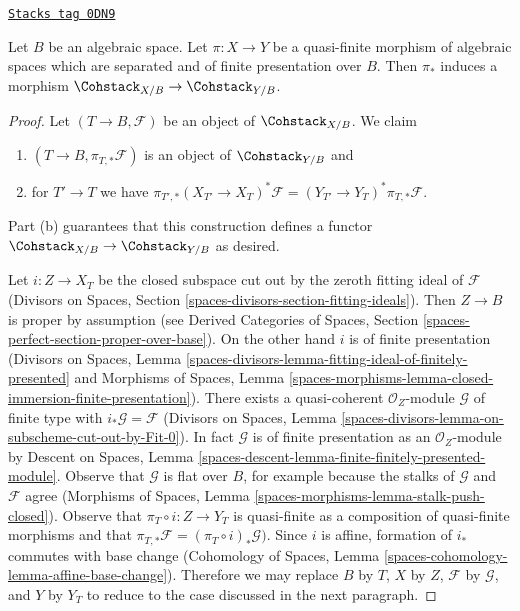 \begin{lemma}
\label{moduli-lemma-coherent-functorial}
\href{https://stacks.math.columbia.edu/tag/0DN9}{\texttt{Stacks tag 0DN9}}

Let $B$ be an algebraic space. Let $\pi : X \to Y$ be a quasi-finite
morphism of algebraic spaces which are separated and of finite presentation
over $B$. Then $\pi_*$ induces a morphism
$\Cohstack_{X/B} \to \Cohstack_{Y/B}$.
\end{lemma}

\begin{proof}
Let $(T \to B, \mathcal{F})$ be an object of $\Cohstack_{X/B}$.
We claim
\begin{enumerate}
\item[(a)] $(T \to B, \pi_{T, *}\mathcal{F})$ is an object
of $\Cohstack_{Y/B}$ and
\item[(b)] for $T' \to T$ we have
$\pi_{T', *}(X_{T'} \to X_T)^*\mathcal{F} =
(Y_{T'} \to Y_T)^*\pi_{T, *}\mathcal{F}$.
\end{enumerate}
Part (b) guarantees that this construction defines a functor
$\Cohstack_{X/B} \to \Cohstack_{Y/B}$ as desired.

\medskip\noindent
Let $i : Z \to X_T$ be the closed subspace cut out by the zeroth
fitting ideal of $\mathcal{F}$
(Divisors on Spaces, Section
\ref{spaces-divisors-section-fitting-ideals}).
Then $Z \to B$ is proper by assumption (see
Derived Categories of Spaces, Section
\ref{spaces-perfect-section-proper-over-base}).
On the other hand $i$ is of finite presentation
(Divisors on Spaces, Lemma
\ref{spaces-divisors-lemma-fitting-ideal-of-finitely-presented} and
Morphisms of Spaces, Lemma
\ref{spaces-morphisms-lemma-closed-immersion-finite-presentation}).
There exists a quasi-coherent $\mathcal{O}_Z$-module
$\mathcal{G}$ of finite type with $i_*\mathcal{G} = \mathcal{F}$
(Divisors on Spaces, Lemma
\ref{spaces-divisors-lemma-on-subscheme-cut-out-by-Fit-0}).
In fact $\mathcal{G}$ is of finite presentation as an $\mathcal{O}_Z$-module
by Descent on Spaces, Lemma
\ref{spaces-descent-lemma-finite-finitely-presented-module}.
Observe that $\mathcal{G}$ is flat over $B$, for example
because the stalks of $\mathcal{G}$ and $\mathcal{F}$ agree
(Morphisms of Spaces, Lemma \ref{spaces-morphisms-lemma-stalk-push-closed}).
Observe that $\pi_T \circ i : Z \to Y_T$ is quasi-finite as a composition
of quasi-finite morphisms and that
$\pi_{T, *}\mathcal{F} = (\pi_T \circ i)_*\mathcal{G})$.
Since $i$ is affine, formation of $i_*$ commutes with base change
(Cohomology of Spaces, Lemma \ref{spaces-cohomology-lemma-affine-base-change}).
Therefore we may replace $B$ by $T$, $X$ by $Z$,
$\mathcal{F}$ by $\mathcal{G}$, and $Y$ by $Y_T$
to reduce to the case discussed in the next paragraph.


\end{proof}
